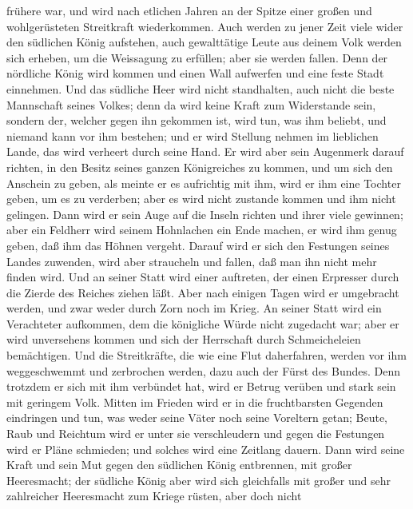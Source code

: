frühere war, und wird nach etlichen Jahren an der Spitze einer großen
und wohlgerüsteten Streitkraft wiederkommen.  Auch werden
zu jener Zeit viele wider den südlichen König aufstehen, auch
gewalttätige Leute aus deinem Volk werden sich erheben, um die
Weissagung zu erfüllen; aber sie werden fallen.  Denn der
nördliche König wird kommen und einen Wall aufwerfen und eine feste
Stadt einnehmen. Und das südliche Heer wird nicht standhalten, auch
nicht die beste Mannschaft seines Volkes; denn da wird keine Kraft zum
Widerstande sein,  sondern der, welcher gegen ihn
gekommen ist, wird tun, was ihm beliebt, und niemand kann vor ihm
bestehen; und er wird Stellung nehmen im lieblichen Lande, das wird
verheert durch seine Hand.  Er wird aber sein Augenmerk
darauf richten, in den Besitz seines ganzen Königreiches zu kommen, und
um sich den Anschein zu geben, als meinte er es aufrichtig mit ihm, wird
er ihm eine Tochter geben, um es zu verderben; aber es wird nicht
zustande kommen und ihm nicht gelingen.  Dann wird er
sein Auge auf die Inseln richten und ihrer viele gewinnen; aber ein
Feldherr wird seinem Hohnlachen ein Ende machen, er wird ihm genug
geben, daß ihm das Höhnen vergeht.  Darauf wird er sich
den Festungen seines Landes zuwenden, wird aber straucheln und fallen,
daß man ihn nicht mehr finden wird.  Und an seiner Statt
wird einer auftreten, der einen Erpresser durch die Zierde des Reiches
ziehen läßt. Aber nach einigen Tagen wird er umgebracht werden, und zwar
weder durch Zorn noch im Krieg.  An seiner Statt wird ein
Verachteter aufkommen, dem die königliche Würde nicht zugedacht war;
aber er wird unversehens kommen und sich der Herrschaft durch
Schmeicheleien bemächtigen.  Und die Streitkräfte, die
wie eine Flut daherfahren, werden vor ihm weggeschwemmt und zerbrochen
werden, dazu auch der Fürst des Bundes.  Denn trotzdem er
sich mit ihm verbündet hat, wird er Betrug verüben und stark sein mit
geringem Volk.  Mitten im Frieden wird er in die
fruchtbarsten Gegenden eindringen und tun, was weder seine Väter noch
seine Voreltern getan; Beute, Raub und Reichtum wird er unter sie
verschleudern und gegen die Festungen wird er Pläne schmieden; und
solches wird eine Zeitlang dauern.  Dann wird seine Kraft
und sein Mut gegen den südlichen König entbrennen, mit großer
Heeresmacht; der südliche König aber wird sich gleichfalls mit großer
und sehr zahlreicher Heeresmacht zum Kriege rüsten, aber doch nicht
